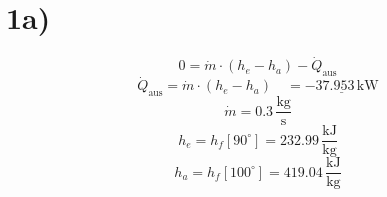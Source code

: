 

\section*{1a)}
\[
0 = \dot{m} \cdot (h_e - h_a) - \dot{Q}_{\text{aus}}
\]
\[
\dot{Q}_{\text{aus}} = \dot{m} \cdot (h_e - h_a) \quad = \underline{-37.953 \, \text{kW}}
\]
\[
\dot{m} = 0.3 \, \frac{\text{kg}}{\text{s}}
\]
\[
h_e = h_f \left[ 90^\circ \right] = 232.99 \, \frac{\text{kJ}}{\text{kg}}
\]
\[
h_a = h_f \left[ 100^\circ \right] = 419.04 \, \frac{\text{kJ}}{\text{kg}}
\]
